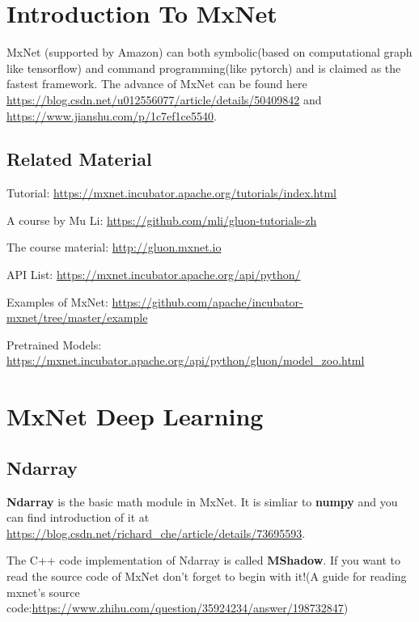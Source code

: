 \documentclass[english]{../TeXTemplate/pkupaper}
\title{\titlemark}
\author{Yiping Lu}
\date{ March 28}
\begin{document}
\maketitle
\section{Introduction To MxNet}


MxNet (supported by Amazon) can both symbolic(based on computational graph like tensorflow) and command programming(like pytorch) and is claimed as the fastest framework. The advance of MxNet can be found here \url{https://blog.csdn.net/u012556077/article/details/50409842} and \url{https://www.jianshu.com/p/1c7ef1ce5540}.


\subsection{Related Material}



Tutorial: \url{https://mxnet.incubator.apache.org/tutorials/index.html}

A course by Mu Li: \url{https://github.com/mli/gluon-tutorials-zh}

The course material: \url{http://gluon.mxnet.io}

API List:
\url{https://mxnet.incubator.apache.org/api/python/}

Examples of MxNet: \url{https://github.com/apache/incubator-mxnet/tree/master/example}

Pretrained Models: \url{https://mxnet.incubator.apache.org/api/python/gluon/model_zoo.html}

\section{MxNet Deep Learning}

\subsection{Ndarray}

\textbf{Ndarray} is the basic math module in MxNet. It is simliar to \textbf{numpy} and you can find introduction of it at \url{https://blog.csdn.net/richard_che/article/details/73695593}.

The C++ code implementation of Ndarray is called \textbf{MShadow}. If you want to read the source code of MxNet don't forget to begin with it!(A guide for reading mxnet's source code:\url{https://www.zhihu.com/question/35924234/answer/198732847})
\end{document}
